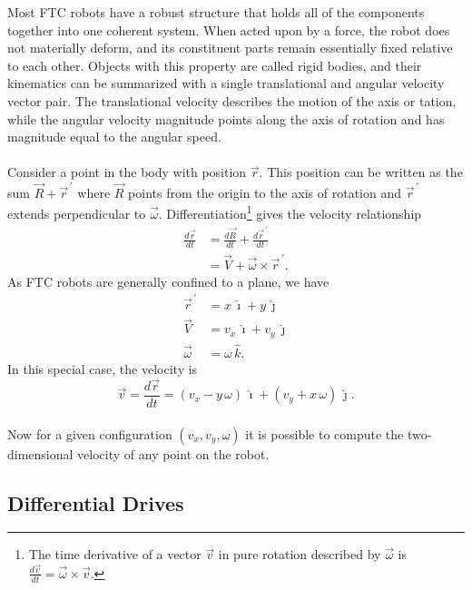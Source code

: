 \documentclass{article}
\newcommand{\cross}{\times}
\newcommand{\pvec}[1]{\vec{#1}^{\,\prime}}
\begin{document}
Most FTC robots have a robust structure that holds all of the components together into one coherent system. When acted upon by a force, the robot does not materially deform, and its constituent parts remain essentially fixed relative to each other. Objects with this property are called rigid bodies, and their kinematics can be summarized with a single translational and angular velocity vector pair. The translational velocity describes the motion of the axis or tation, while the angular velocity magnitude points along the axis of rotation and has magnitude equal to the angular speed.\\
\\
Consider a point in the body with position $\vec{r}$. This position can be written as the sum $\vec{R} + \pvec{r}$ where $\vec{R}$ points from the origin to the axis of rotation and $\pvec{r}$ extends perpendicular to $\vec{\omega}$. Differentiation\footnote{The time derivative of a vector $\vec{v}$ in pure rotation described by $\vec{\omega}$ is $\frac{d\vec{v}}{dt} = \vec{\omega} \cross \vec{v}$.} gives the velocity relationship
\begin{align*}
    \frac{d\vec{r}}{dt} &= \frac{d\vec{R}}{dt} + \frac{d\pvec{r}}{dt} \\
    &= \vec{V} + \vec{\omega} \cross \pvec{r}.
\end{align*}
As FTC robots are generally confined to a plane, we have
\begin{align*}
    \pvec{r} &= x \, \hat{\imath} + y \, \hat{\jmath}\\
    \vec{V} &= v_x \, \hat{\imath} + v_y \, \hat{\jmath}\\
    \vec{\omega} &= \omega \, \hat{k}.
\end{align*}
In this special case, the velocity is
\[
    \vec{v} = \frac{d\vec{r}}{dt} = (v_x - y \, \omega) \, \hat{\imath} + (v_y + x \, \omega) \, \hat{\jmath}.
\]
\\
Now for a given configuration $(v_x, v_y, \omega)$ it is possible to compute the two-dimensional velocity of any point on the robot. 

\subsection{Differential Drives}
\end{document}
